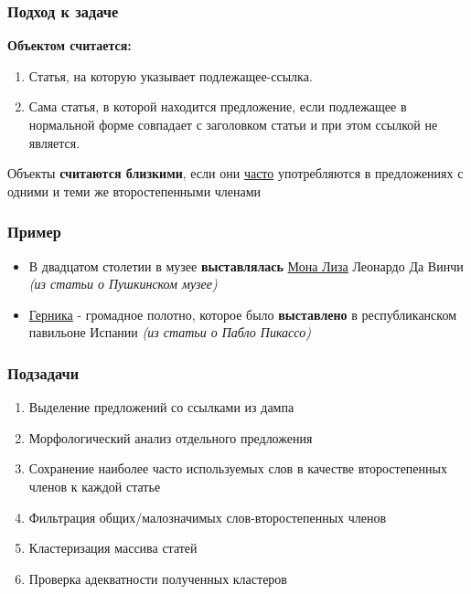 \documentclass{beamer}
\begin{document}
\begin{frame}
\frametitle{Подход к задаче}
{\bf Объектом считается:}\\
\begin{enumerate}
\item {
Статья, на которую указывает подлежащее-ссылка.
}
\item {
Сама статья, в которой находится предложение, если подлежащее в
нормальной форме совпадает с заголовком статьи и при этом ссылкой не
является.
}
\end{enumerate}

Объекты {\bf считаются близкими}, если они {\underline{часто}} употребляются в предложениях с одними и теми же второстепенными членами \\

\end{frame}

\begin{frame}

\frametitle{Пример}
\begin{itemize}

\item {
В двадцатом столетии в музее {\bf выставлялась} \underline{Мона Лиза} Леонардо Да Винчи {\it (из статьи о Пушкинском музее)}
}

\item {
\underline{Герника} - громадное полотно, которое было {\bf выставлено} в республиканском павильоне Испании {\it (из статьи о Пабло Пикассо)}
}

\end{itemize}
\end{frame}

\begin{frame}
\frametitle{Подзадачи}
\begin{enumerate}

\item {
Выделение предложений со ссылками из дампа
}
\item {
Морфологический анализ отдельного предложения
}
\item {
}
Сохранение наиболее часто используемых слов в качестве второстепенных членов к каждой статье
\item {
}
Фильтрация общих/малозначимых слов-второстепенных членов
\item {
Кластеризация массива статей
}
\item {
Проверка адекватности полученных кластеров
}

\end{enumerate}
\end{frame}
\end{document}
